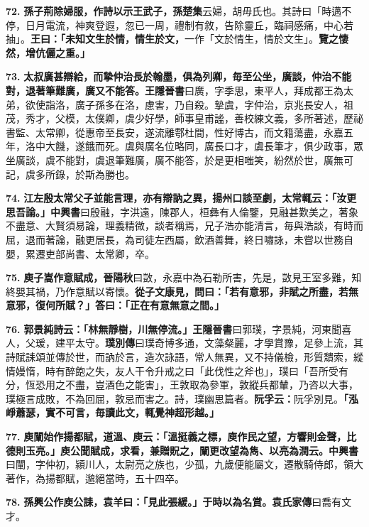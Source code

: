 \textbf{72.} \textbf{孫子荊除婦服，作詩以示王武子，}{\footnotesize \textbf{孫楚集}云婦，胡毋氏也。其詩曰「時邁不停，日月電流，神爽登遐，忽已一周，禮制有敘，告除靈丘，臨祠感痛，中心若抽」。}\textbf{王曰：「未知文生於情，情生於文，}{\footnotesize 一作「文於情生，情於文生」。}\textbf{覽之悽然，增伉儷之重。」}

\textbf{73.} \textbf{太叔廣甚辯給，而摯仲治長於翰墨，俱為列卿，毎至公坐，廣談，仲治不能對，退著筆難廣，廣又不能答。}{\footnotesize \textbf{王隱晉書}曰廣，字季思，東平人，拜成都王為太弟，欲使詣洛，廣子孫多在洛，慮害，乃自殺。摯虞，字仲治，京兆長安人，祖茂，秀才，父模，太僕卿，虞少好學，師事皇甫謐，善校練文義，多所著述，歷祕書監、太常卿，從惠帝至長安，遂流離鄠杜間，性好博古，而文籍蕩盡，永嘉五年，洛中大饑，遂餓而死。虞與廣名位略同，廣長口才，虞長筆才，俱少政事，眾坐廣談，虞不能對，虞退筆難廣，廣不能答，於是更相嗤笑，紛然於世，廣無可記，虞多所錄，於斯為勝也。}

\textbf{74.} \textbf{江左殷太常父子並能言理，亦有辯訥之異，揚州口談至劇，太常輒云：「汝更思吾論。」}{\footnotesize \textbf{中興書}曰殷融，字洪遠，陳郡人，桓彝有人倫鑒，見融甚歎美之，著象不盡意、大賢須易論，理義精微，談者稱焉，兄子浩亦能清言，毎與浩談，有時而屈，退而著論，融更居長，為司徒左西屬，飲酒善舞，終日嘯詠，未嘗以世務自嬰，累遷吏部尚書、太常卿，卒。}

\textbf{75.} \textbf{庾子嵩作意賦成，}{\footnotesize \textbf{晉陽秋}曰敳，永嘉中為石勒所害，先是，敳見王室多難，知終嬰其禍，乃作意賦以寄懷。}\textbf{從子文康見，問曰：「若有意邪，非賦之所盡，若無意邪，復何所賦？」答曰：「正在有意無意之間。」}

\textbf{76.} \textbf{郭景純詩云：「林無靜樹，川無停流。」}{\footnotesize \textbf{王隱晉書}曰郭璞，字景純，河東聞喜人，父瑗，建平太守。\textbf{璞別傳}曰璞奇博多通，文藻粲麗，才學賞豫，足參上流，其詩賦誄頌並傳於世，而訥於言，造次詠語，常人無異，又不持儀檢，形質穨索，縱情嫚惰，時有醉飽之失，友人干令升戒之曰「此伐性之斧也」，璞曰「吾所受有分，恆恐用之不盡，豈酒色之能害」，王敦取為參軍，敦縱兵都輦，乃咨以大事，璞極言成敗，不為回屈，敦忌而害之。詩，璞幽思篇者。}\textbf{阮孚云：}{\footnotesize 阮孚別見。}\textbf{「泓崢蕭瑟，實不可言，毎讀此文，輒覺神超形越。」}

\textbf{77.} \textbf{庾闡始作揚都賦，道溫、庾云：「溫挺義之標，庾作民之望，方響則金聲，比德則玉亮。」庾公聞賦成，求看，兼贈貺之，闡更改望為雋、以亮為潤云。}{\footnotesize \textbf{中興書}曰闡，字仲初，潁川人，太尉亮之族也，少孤，九歲便能屬文，遷散騎侍郎，領大著作，為揚都賦，邈絕當時，五十四卒。}

\textbf{78.} \textbf{孫興公作庾公誄，袁羊曰：「見此張緩。」于時以為名賞。}{\footnotesize \textbf{袁氏家傳}曰喬有文才。}

